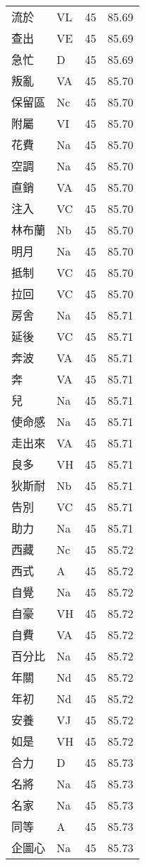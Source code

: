 \documentclass[twocolumn]{book}
\begin{document}
\begin{supertabular}{llrr}
流於 & VL & 45 &  85.69\\
查出 & VE & 45 &  85.69\\
急忙 & D & 45 &  85.69\\
叛亂 & VA & 45 &  85.70\\
保留區 & Nc & 45 &  85.70\\
附屬 & VI & 45 &  85.70\\
花費 & Na & 45 &  85.70\\
空調 & Na & 45 &  85.70\\
直銷 & VA & 45 &  85.70\\
注入 & VC & 45 &  85.70\\
林布蘭 & Nb & 45 &  85.70\\
明月 & Na & 45 &  85.70\\
抵制 & VC & 45 &  85.70\\
拉回 & VC & 45 &  85.70\\
房舍 & Na & 45 &  85.71\\
延後 & VC & 45 &  85.71\\
奔波 & VA & 45 &  85.71\\
奔 & VA & 45 &  85.71\\
兒 & Na & 45 &  85.71\\
使命感 & Na & 45 &  85.71\\
走出來 & VA & 45 &  85.71\\
良多 & VH & 45 &  85.71\\
狄斯耐 & Nb & 45 &  85.71\\
告別 & VC & 45 &  85.71\\
助力 & Na & 45 &  85.71\\
西藏 & Nc & 45 &  85.72\\
西式 & A & 45 &  85.72\\
自覺 & Na & 45 &  85.72\\
自豪 & VH & 45 &  85.72\\
自費 & VA & 45 &  85.72\\
百分比 & Na & 45 &  85.72\\
年關 & Nd & 45 &  85.72\\
年初 & Nd & 45 &  85.72\\
安養 & VJ & 45 &  85.72\\
如是 & VH & 45 &  85.72\\
合力 & D & 45 &  85.73\\
名將 & Na & 45 &  85.73\\
名家 & Na & 45 &  85.73\\
同等 & A & 45 &  85.73\\
企圖心 & Na & 45 &  85.73\\

\end{supertabular}
\end{document}
